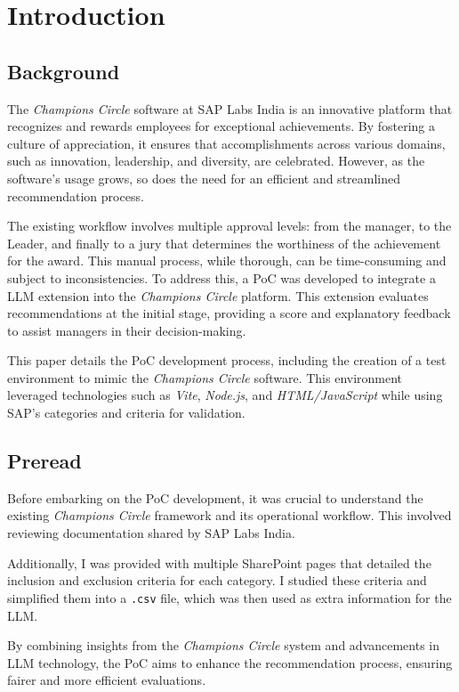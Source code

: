 \chapter{Introduction}
\label{introduction}
\nocite{*}

\section{Background}
The \textit{Champions Circle} software at SAP Labs India is an innovative platform that recognizes and rewards employees for exceptional achievements. 
By fostering a culture of appreciation, it ensures that accomplishments across various domains, such as innovation, leadership, and diversity, are celebrated. 
However, as the software's usage grows, so does the need for an efficient and streamlined recommendation process.

The existing workflow involves multiple approval levels: from the manager, to the Leader, and finally to a jury that determines the worthiness of the achievement for the award. 
This manual process, while thorough, can be time-consuming and subject to inconsistencies. 
To address this, a \ac{PoC} was developed to integrate a \ac{LLM} extension into the \textit{Champions Circle} platform. 
This extension evaluates recommendations at the initial stage, providing a score and explanatory feedback to assist managers in their decision-making.

This paper details the \ac{PoC} development process, including the creation of a test environment to mimic the \textit{Champions Circle} software. 
This environment leveraged technologies such as \textit{Vite}, \textit{Node.js}, and \textit{HTML/JavaScript} while using SAP's categories and criteria for validation.

\section{Preread}
Before embarking on the \ac{PoC} development, it was crucial to understand the existing \textit{Champions Circle} framework and its operational workflow. 
This involved reviewing documentation shared by SAP Labs India. 

Additionally, I was provided with multiple SharePoint pages that detailed the inclusion and exclusion criteria for each category. 
I studied these criteria and simplified them into a \texttt{.csv} file, which was then used as extra information for the \ac{LLM}.

By combining insights from the \textit{Champions Circle} system and advancements in \ac{LLM} technology, the \ac{PoC} aims to enhance the recommendation process, 
ensuring fairer and more efficient evaluations.
